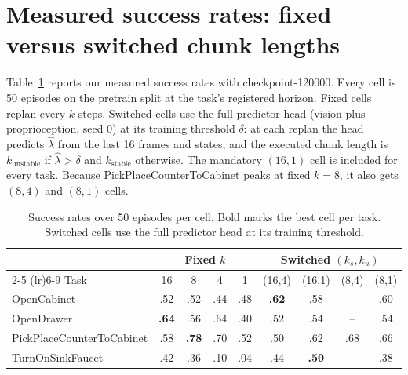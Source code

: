 \documentclass[11pt]{article}
\begin{document}
\section{Measured success rates: fixed versus switched chunk lengths}
\label{sec:rates}

Table~\ref{tab:rates} reports our measured success rates with
checkpoint-120000. Every cell is 50 episodes on the pretrain split at the
task's registered horizon. Fixed cells replan every $k$ steps. Switched cells
use the full predictor head (vision plus proprioception, seed 0) at its
training threshold $\delta$: at each replan the head predicts $\hat\lambda$
from the last 16 frames and states, and the executed chunk length is
$k_{\text{unstable}}$ if $\hat\lambda > \delta$ and $k_{\text{stable}}$
otherwise. The mandatory $(16,1)$ cell is included for every task. Because
PickPlaceCounterToCabinet peaks at fixed $k=8$, it also gets $(8,4)$ and
$(8,1)$ cells.

\begin{table}[h]
\centering
\small
\begin{tabular}{lcccccccc}
\toprule
& \multicolumn{4}{c}{Fixed $k$} & \multicolumn{4}{c}{Switched $(k_s, k_u)$} \\
\cmidrule(lr){2-5} \cmidrule(lr){6-9}
Task & 16 & 8 & 4 & 1 & (16,4) & (16,1) & (8,4) & (8,1) \\
\midrule
OpenCabinet              & .52 & .52 & .44 & .48 & \textbf{.62} & .58 & --   & .60 \\
OpenDrawer               & \textbf{.64} & .56 & .64 & .40 & .52 & .54 & --   & .54 \\
PickPlaceCounterToCabinet & .58 & \textbf{.78} & .70 & .52 & .50 & .62 & .68 & .66 \\
TurnOnSinkFaucet         & .42 & .36 & .10 & .04 & .44 & \textbf{.50} & --   & .38 \\
\bottomrule
\end{tabular}
\caption{Success rates over 50 episodes per cell. Bold marks the best cell per
task. Switched cells use the full predictor head at its training threshold.}
\label{tab:rates}
\end{table}
\end{document}
